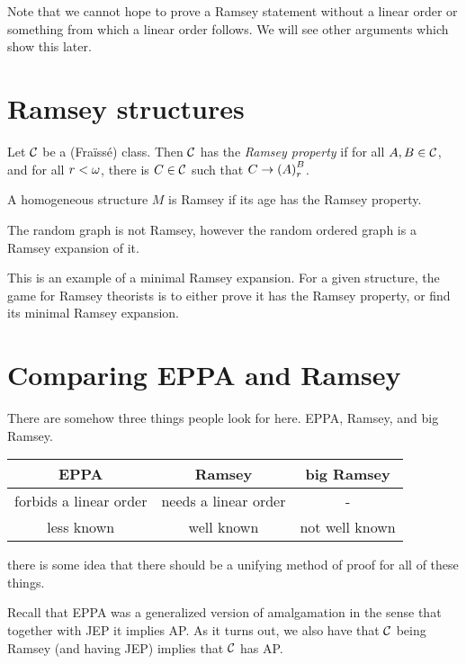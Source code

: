\documentclass{amsart}
\begin{document}
Note that we cannot hope to prove a Ramsey statement without a linear order or something
from which a linear order follows.
We will see other arguments which show this later.

\section{Ramsey structures}

\begin{defn}
Let $\mathcal{C}$ be a (Fra\"{i}ss\'{e}) class. Then $\mathcal{C}$ has the \emph{Ramsey property} if for all
$A,B\in \mathcal{C}$, and for all $r < \omega$, there is $C\in \mathcal{C}$ such that $C\rightarrow \left( A
\right)_r^B$.
\end{defn}

\begin{defn}
A homogeneous structure $M$ is Ramsey if its age has the Ramsey property.
\end{defn}

\begin{exm}
The random graph is not Ramsey, however the random ordered graph is a Ramsey expansion of
it.
\end{exm}

This is an example of a minimal Ramsey expansion.
For a given structure, the game for Ramsey theorists is to either prove it has the Ramsey
property, or find its minimal Ramsey expansion.

\section{Comparing EPPA and Ramsey}

There are somehow three things people look for here. EPPA, Ramsey, and big Ramsey.
\begin{center}
\begin{tabular}{|c|c|c|}
\hline
EPPA & Ramsey & big Ramsey\\
\hline\hline
forbids a linear order 
&needs a linear order&-
\\
\hline
less known
&well known\footnotemark&
not well known\\
\hline
\end{tabular}
\end{center}
there is some idea that there should be a unifying method of proof for all of these
things.

Recall that EPPA was a generalized version of amalgamation in the sense that together with
JEP it implies AP.
As it turns out, we also
have that $\mathcal{C}$ being Ramsey (and having JEP) implies that $\mathcal{C}$ has AP.
\end{document}
